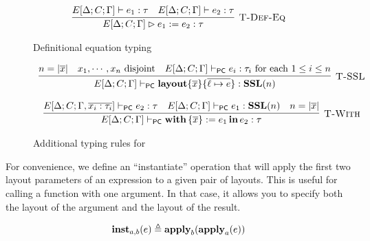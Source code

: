 \begin{figure}
  \[
    \begin{array}{c}
      \labinfer[T-Def-Eq]{E[\Delta;C;\Gamma] \rhd e_1 \defeq e_2 : \tau}
        {E[\Delta;C;\Gamma] \vdash e_1 : \tau
        &E[\Delta;C;\Gamma] \vdash e_2 : \tau}
    \end{array}
  \]
  \caption{Definitional equation typing}
  \label{fig:def-eq}
\end{figure}

\begin{figure}
  \[
    \begin{array}{c}
      \labinfer[T-SSL]{E[\Delta;C;\Gamma] \vdashpc \sslmath{\overline{x}}{\overline{\ell \mapsto e}} : \SSL(n)}
        {n = |\overline{x}|
        &x_1,\cdots,x_n \textnormal{ disjoint}
        &E[\Delta;C;\Gamma] \vdashpc e_i : \tau_i \ensuremath{\textnormal{ for each $1 \le i \le n$}}
        }
      \\\\
      \labinfer[T-With]{E[\Delta;C;\Gamma] \vdashpc \withIn{\{ \overline{x} \} := e_1} e_2 : \tau}
        {E[\Delta;C;\Gamma,\overline{x_i : \tau_i}] \vdashpc e_2 : \tau
        &E[\Delta;C;\Gamma] \vdashpc e_1 : \SSL(n)
        &n = |\overline{x}|
        }
    \end{array}
  \]
  \caption{Additional typing rules for \PikaCore}
  \label{fig:pikacore-typing-judgment}
\end{figure}

For convenience, we define an ``instantiate'' operation \instExpr{} that will apply the first two
layout parameters of an expression to a given pair of layouts. This is useful for calling a function
with one argument. In that case, it allows you to specify both the layout of the argument and the
layout of the result.

\[
  \textbf{inst}_{a,b}(e) \triangleq \textbf{apply}_b(\textbf{apply}_a(e))
\]



